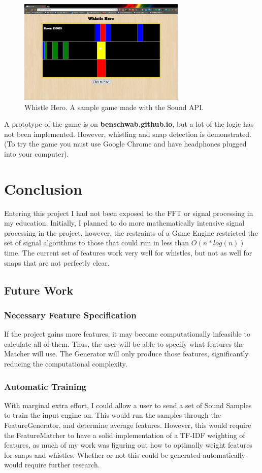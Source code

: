 \documentclass[DIV=calc, paper=a4, fontsize=11pt, twocolumn]{scrartcl}   %
\begin{document}
    \begin{figure}[h]
   \centering
   \includegraphics[width=80mm]{figures/whistlehero.png}
   \caption{Whistle Hero. A sample game made with the Sound API.}
   \label{overflow}
   \end{figure}

   \par A prototype of the game is on \textbf{benschwab.github.io}, but a lot of the logic has not been implemented. However, whistling and snap detection is demonstrated. (To try the game you must use Google Chrome and have headphones plugged into your computer).

\section{Conclusion}
   Entering this project I had not been exposed to the FFT or signal processing in my education. Initially, I planned to do more mathematically intensive signal processing in the project, however, the restraints of a Game Engine restricted the set of signal algorithms to those that could run in less than $O(n*log(n))$ time. The current set of features work very well for whistles, but not as well for snaps that are not perfectly clear.
   \subsection{Future Work}
   \subsubsection{Necessary Feature Specification}
  If the project gains more features, it may become computationally infeasible to calculate all of them. Thus, the user will be able to specify what features the Matcher will use. The Generator will only produce those features, significantly reducing the computational complexity.
   \subsubsection{Automatic Training}
   With marginal extra effort, I could allow a user to send a set of Sound Samples to train the input engine on. This would run the samples through the FeatureGenerator, and determine average features. However, this would require the FeatureMatcher to have a solid implementation of a TF-IDF weighting of features, as much of my work was figuring out how to optimally weight features for snaps and whistles. Whether or not this could be generated automatically would require further research.
\end{document}
